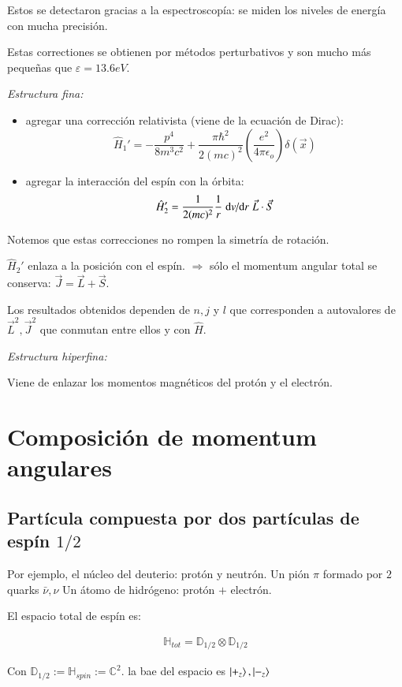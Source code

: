 Estos se detectaron gracias a la espectroscopía: se miden los niveles de energía con mucha precisión.

Estas correctiones se obtienen por métodos perturbativos y son mucho más pequeñas que $\varepsilon=13.6eV$.

\textit{Estructura fina:}
\begin{itemize}
    \item agregar una corrección relativista (viene de la ecuación de Dirac):
    $$
    \hat{H}_1'=-\frac{p^4}{8m^3c^2}+\frac{\pi\hbar^2}{2(mc)^2}\left(\frac{e^2}{4\pi\epsilon_o}\right)\delta(\vec{x})
    $$
    \item agregar la interacción del espín con la órbita:
    $$
    \hat{H}_2'=\frac{1}{2(mc)^2}\frac{1}{r}\dv*{v}{r}\vec{L}\cdot\vec{S}
    $$
\end{itemize}

Notemos que estas correcciones no rompen la simetría de rotación. 

$\hat{H}_2'$ enlaza a la posición con el espín. $\Rightarrow$ sólo el momentum angular total se conserva: $\vec{J}=\vec{L}+\vec{S}$.

Los resultados obtenidos dependen de $n,j$ y $l$ que corresponden a autovalores de $\vec{L}^2,\vec{J}^2$ que conmutan entre ellos y con $\hat{H}$.

\textit{Estructura hiperfina:}

Viene de enlazar los momentos magnéticos del protón y el electrón.



\section{Composición de momentum angulares}

\subsection{Partícula compuesta por dos partículas de espín $1/2$}

Por ejemplo, el núcleo del deuterio: protón y neutrón.
Un pión $\pi$ formado por $2$ quarks $\bar{\nu},\nu$ 
Un átomo de hidrógeno: protón $+$ electrón.

El espacio total de espín es:

\begin{align*}
    \mathbb{H}_{tot}=\mathbb{D}_{1/2}\otimes \mathbb{D}_{1/2}
\end{align*}

Con $\mathbb{D}_{1/2}:=\mathbb{H}_{spin}:=\mathbb{C}^2$. la bae del espacio es $\ket{+_z},\ket{-_z}$

